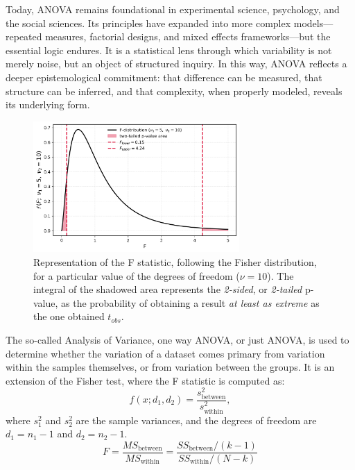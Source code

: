\documentclass{book}
\begin{document}
Today, ANOVA remains foundational in experimental science, psychology, and the social sciences. Its principles have expanded into more complex models—repeated measures, factorial designs, and mixed effects frameworks—but the essential logic endures. It is a statistical lens through which variability is not merely noise, but an object of structured inquiry. In this way, ANOVA reflects a deeper epistemological commitment: that difference can be measured, that structure can be inferred, and that complexity, when properly modeled, reveals its underlying form.\\

\begin{figure}[ht]
    \centering
    \includegraphics[width=0.7\textwidth]{figures/chapter4/f_test_two_tailed.png}
    \caption{Representation of the F statistic, following the Fisher distribution, for a particular value of the degrees of freedom ($\nu = 10$). The integral of the shadowed area represents the \textit{2-sided}, or \textit{2-tailed} p-value, as the probability of obtaining a result \textit{at least as extreme} as the one obtained $t_{obs}$.}
    \label{fig:f_test2}
\end{figure}

The so-called Analysis of Variance, one way ANOVA, or just ANOVA, is used to determine whether the variation of a dataset comes primary from variation within the samples themselves, or from variation between the groups. It is an extension of the Fisher test, where the F statistic is computed as:
\[
    f(x; d_{1}, d_{2}) = \frac{s_\text{between}^{2}}{s_\text{within}^{2}},
\]
where $s_1^{2}$ and $s_2^{2}$ are the sample variances, and the degrees of freedom are $d_1 = n_1 - 1$ and $d_2 = n_2 - 1$.\\

\[
F = \frac{MS_{\text{between}}}{MS_{\text{within}}} = \frac{SS_{\text{between}} / (k - 1)}{SS_{\text{within}} / (N - k)}
\]
\end{document}
